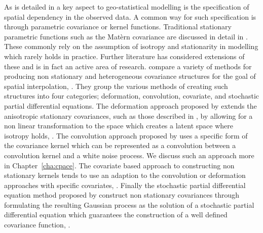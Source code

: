 As is detailed in \cite{cressie_statistics_2015} a key aspect to geo-statistical modelling is the specification of spatial dependency in the observed data.
A common way for such specification is through parametric covariance or kernel functions.
Traditional stationary parametric functions such as the Mat\`{e}rn covariance are discussed in detail in \cite{cressie_statistics_2015}.
These commonly rely on the assumption of isotropy and stationarity in modelling which rarely holds in practice.
Further literature has considered extensions of these and is in fact an active area of research.
\citeauthor{schmidt_flexible_2020} compare a variety of methods for producing non stationary and heterogeneous covariance structures for the goal of spatial interpolation, \citep{schmidt_flexible_2020}.
They group the various methods of creating such structures into four categories; deformation, convolution, covariate, and stochastic partial differential equations.
The deformation approach proposed by \citeauthor{sampson_nonparametric_1992} extends the anisotropic stationary covariances, such as those described in \cite{cressie_statistics_2015}, by allowing for a non linear transformation to the space which creates a latent space where isotropy holds, \cite{sampson_nonparametric_1992}.
The convolution approach proposed by \citeauthor{higdon_space_2002} uses a specific form of the covariance kernel which can be represented as a convolution between a convolution kernel and a white noise process.
We discuss such an approach more in Chapter~\ref{cha:cpace}.
The covariate based approach to constructing non stationary kernels tends to use an adaption to the convolution or deformation approaches with specific covariates, \citep{schmidt_flexible_2020}.
Finally the stochastic partial differential equation method proposed by \citeauthor{lindgren_explicit_2011} construct non stationary covariances through formulating the resulting Gaussian process as the solution of a stochastic partial differential equation which guarantees the construction of a well defined covariance function, \citep{lindgren_explicit_2011}. 

